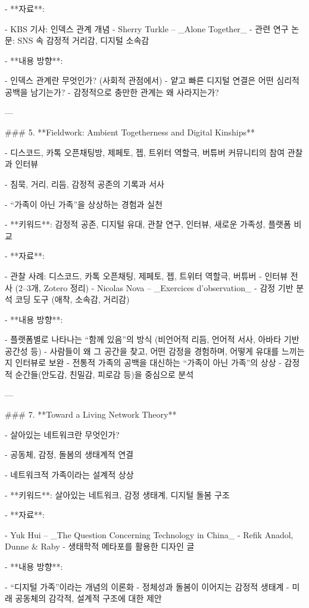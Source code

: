 - **자료**:

  - KBS 기사: 인덱스 관계 개념
  - Sherry Turkle – _Alone Together_
  - 관련 연구 논문: SNS 속 감정적 거리감, 디지털 소속감

- **내용 방향**:

  - 인덱스 관계란 무엇인가? (사회적 관점에서)
  - 얕고 빠른 디지털 연결은 어떤 심리적 공백을 남기는가?
  - 감정적으로 충만한 관계는 왜 사라지는가?

---

### 5. **Fieldwork: Ambient Togetherness and Digital Kinships**

- 디스코드, 카톡 오픈채팅방, 제페토, 젭, 트위터 역할극, 버튜버 커뮤니티의 참여 관찰과 인터뷰

- 침묵, 거리, 리듬, 감정적 공존의 기록과 서사

- “가족이 아닌 가족”을 상상하는 경험과 실천

- **키워드**: 감정적 공존, 디지털 유대, 관찰 연구, 인터뷰, 새로운 가족성, 플랫폼 비교

- **자료**:

  - 관찰 사례: 디스코드, 카톡 오픈채팅, 제페토, 젭, 트위터 역할극, 버튜버
  - 인터뷰 전사 (2–3개, Zotero 정리)
  - Nicolas Nova – _Exercices d’observation_
  - 감정 기반 분석 코딩 도구 (애착, 소속감, 거리감)

- **내용 방향**:

  - 플랫폼별로 나타나는 “함께 있음”의 방식 (비언어적 리듬, 언어적 서사, 아바타 기반 공간성 등)
  - 사람들이 왜 그 공간을 찾고, 어떤 감정을 경험하며, 어떻게 유대를 느끼는지 인터뷰로 보완
  - 전통적 가족의 공백을 대신하는 “가족이 아닌 가족”의 상상
  - 감정적 순간들(안도감, 친밀감, 피로감 등)을 중심으로 분석

---

### 7. **Toward a Living Network Theory**

- 살아있는 네트워크란 무엇인가?

- 공동체, 감정, 돌봄의 생태계적 연결

- 네트워크적 가족이라는 설계적 상상

- **키워드**: 살아있는 네트워크, 감정 생태계, 디지털 돌봄 구조

- **자료**:

  - Yuk Hui – _The Question Concerning Technology in China_
  - Refik Anadol, Dunne & Raby
  - 생태학적 메타포를 활용한 디자인 글

- **내용 방향**:

  - “디지털 가족”이라는 개념의 이론화
  - 정체성과 돌봄이 이어지는 감정적 생태계
  - 미래 공동체의 감각적, 설계적 구조에 대한 제안

